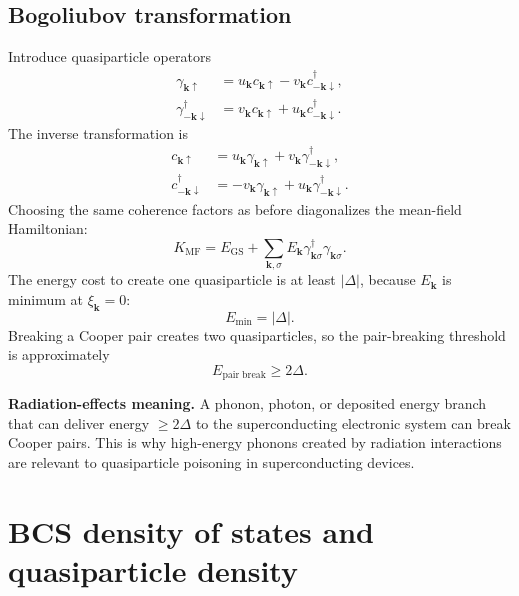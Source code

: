 \documentclass[11pt]{article}
\numberwithin{equation}{section}
\newcommand{\kvec}{\bm{k}}
\begin{document}
\subsection{Bogoliubov transformation}

Introduce quasiparticle operators
\begin{align}
\gamma_{\kvec\uparrow}&=u_{\kvec} c_{\kvec\uparrow}-v_{\kvec} c_{-\kvec\downarrow}^{\dagger},\\
\gamma_{-\kvec\downarrow}^{\dagger}&=v_{\kvec} c_{\kvec\uparrow}+u_{\kvec} c_{-\kvec\downarrow}^{\dagger}.
\end{align}
The inverse transformation is
\begin{align}
c_{\kvec\uparrow}&=u_{\kvec}\gamma_{\kvec\uparrow}+v_{\kvec}\gamma_{-\kvec\downarrow}^{\dagger},\\
c_{-\kvec\downarrow}^{\dagger}&=-v_{\kvec}\gamma_{\kvec\uparrow}+u_{\kvec}\gamma_{-\kvec\downarrow}^{\dagger}.
\end{align}
Choosing the same coherence factors as before diagonalizes the mean-field Hamiltonian:
\begin{equation}
K_{\mathrm{MF}}=E_{\mathrm{GS}}+\sum_{\kvec,\sigma}E_{\kvec}\gamma_{\kvec\sigma}^{\dagger}\gamma_{\kvec\sigma}.
\end{equation}
The energy cost to create one quasiparticle is at least $|\Delta|$, because $E_{\kvec}$ is minimum at $\xi_{\kvec}=0$:
\begin{equation}
E_{\min}=|\Delta|.
\end{equation}
Breaking a Cooper pair creates two quasiparticles, so the pair-breaking threshold is approximately
\begin{equation}
\boxed{E_{\mathrm{pair\;break}}\ge 2\Delta.}
\end{equation}

\begin{physicsbox}
\textbf{Radiation-effects meaning.} A phonon, photon, or deposited energy branch that can deliver energy $\ge 2\Delta$ to the superconducting electronic system can break Cooper pairs. This is why high-energy phonons created by radiation interactions are relevant to quasiparticle poisoning in superconducting devices.
\end{physicsbox}

\section{BCS density of states and quasiparticle density}
\end{document}
